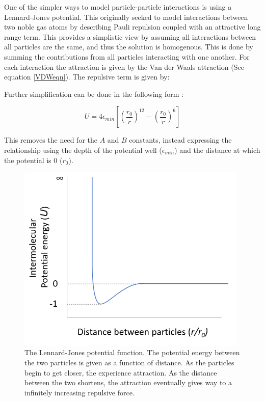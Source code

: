 One of the simpler ways to model particle-particle interactions is using a Lennard-Jones potential. This originally seeked to model interactions between two noble gas atoms by describing Pauli repulsion coupled with an attractive long range term. This provides a simplistic view by assuming all interactions between all particles are the same, and thus the solution is homogenous. This is done by summing the contributions from all particles interacting with one another. For each interaction the attraction is given by the Van der Waals attraction (See equation \ref{VDWeqn}). The repulsive term is given by:


Further simplification can be done in the following form \cite{lilBlueBook}:

\begin{equation} %
U = 4 \epsilon_{min} \left[\left(\frac{r_0}{r}\right)^{12} - \left(\frac{r_0}{r}\right)^6\right]
\end{equation}



This removes the need for the $A$ and $B$ constants, instead expressing the relationship using the depth of the potential well ($\epsilon_{min}$) and the distance at which the potential is 0 ($r_0$).  

\begin{figure}[h]     %
        \begin{center}
          \includegraphics[width=110mm]{chapter1/Lennard's potato.PNG}
\end{center}
\caption{The Lennard-Jones potential function. The potential energy between the two particles is given as a function of distance. As the particles begin to get closer, the experience attraction. As the distance between the two shortens, the attraction eventually gives way to a infinitely increasing repulsive force.}
\label{fig:potato}                 %
\end{figure}

